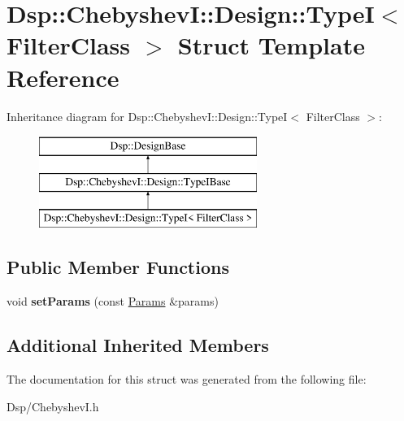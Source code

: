 \hypertarget{structDsp_1_1ChebyshevI_1_1Design_1_1TypeI}{\section{Dsp\-:\-:Chebyshev\-I\-:\-:Design\-:\-:Type\-I$<$ Filter\-Class $>$ Struct Template Reference}
\label{structDsp_1_1ChebyshevI_1_1Design_1_1TypeI}
}
Inheritance diagram for Dsp\-:\-:Chebyshev\-I\-:\-:Design\-:\-:Type\-I$<$ Filter\-Class $>$\-:\begin{figure}[H]
\begin{center}
\leavevmode
\includegraphics[height=3.000000cm]{structDsp_1_1ChebyshevI_1_1Design_1_1TypeI}
\end{center}
\end{figure}
\subsection*{Public Member Functions}
\begin{DoxyCompactItemize}
\item 
\hypertarget{structDsp_1_1ChebyshevI_1_1Design_1_1TypeI_aabbb8d235c0e6b4a0efe4c93f5f9ae7a}{void {\bfseries set\-Params} (const \hyperlink{structDsp_1_1Params}{Params} \&params)}\label{structDsp_1_1ChebyshevI_1_1Design_1_1TypeI_aabbb8d235c0e6b4a0efe4c93f5f9ae7a}

\end{DoxyCompactItemize}
\subsection*{Additional Inherited Members}


The documentation for this struct was generated from the following file\-:\begin{DoxyCompactItemize}
\item 
Dsp/Chebyshev\-I.\-h\end{DoxyCompactItemize}
